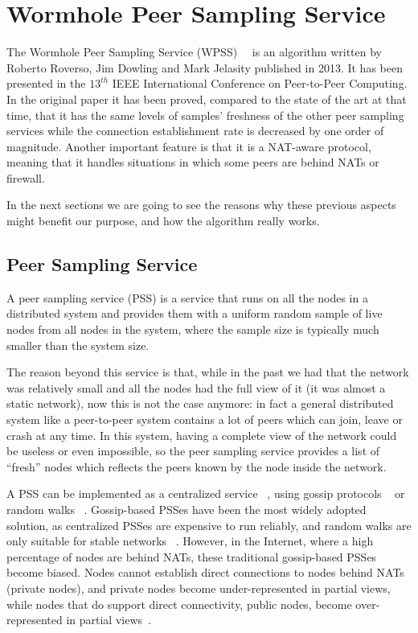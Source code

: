 \chapter{Wormhole Peer Sampling Service}
\label{cha:wormhole}
The Wormhole Peer Sampling Service (WPSS)~~\cite{wormhole} is an algorithm written by Roberto Roverso, Jim Dowling and Mark Jelasity published in 2013. It has been presented in the $13^{th}$ IEEE International Conference on Peer-to-Peer Computing. In the original paper it has been proved, compared to the state of the art at that time, that it has the same levels of samples' freshness  of the other peer sampling services while the connection establishment rate is decreased by one order of magnitude. Another important feature is that it is a NAT-aware protocol, meaning that it handles situations in which some peers are behind NATs or firewall.

In the next sections we are going to see the reasons why these previous aspects might benefit our purpose, and how the algorithm really works.

\section{Peer Sampling Service}
\label{sec:pss}
A peer sampling service (PSS) is a service that runs on all the nodes in a distributed system and provides them with a uniform random sample of live nodes from all nodes in the system, where the sample size is typically much smaller than the system size. 

The reason beyond this service is that, while in the past we had that the network was relatively small and all the nodes had the full view of it (it was almost a static network), now this is not the case anymore: in fact a general distributed system like a peer-to-peer system contains a lot of peers which can join, leave or crash at any time. In this system, having a complete view of the network could be useless or even impossible, so the peer sampling service provides a list of ``fresh'' nodes which reflects the peers known by the node inside the network.

A PSS can be implemented as a centralized service ~\cite{spotify}, using gossip protocols ~\cite{gossip_protocol} or random walks ~\cite{rw}. Gossip-based PSSes have been the most widely adopted solution, as centralized PSSes are expensive to run reliably, and random walks are only suitable for stable networks ~\cite{rw}. However, in the Internet, where a high percentage of nodes are behind NATs, these traditional gossip-based PSSes become biased. Nodes cannot establish direct connections to nodes behind NATs (private nodes), and private nodes become under-represented in partial views, while nodes that do support direct connectivity, public nodes, become over-represented in partial views~\cite{gozar}. 

